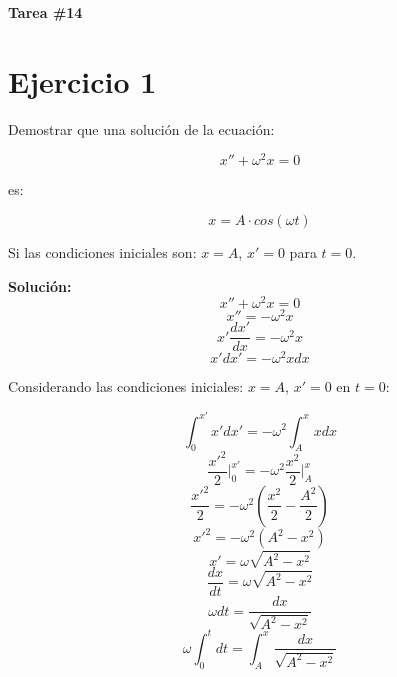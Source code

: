 \documentclass[letter,11pt]{article}
\begin{document}
\begin{center}
    {\Large \bf{Tarea \#14}}
\end{center}

\section{Ejercicio 1}

Demostrar que una solución de la ecuación:

\begin{equation}
    x'' + \omega^2 x = 0
\end{equation}

es:

\begin{equation}
    x = A \cdot cos(\omega t)
\end{equation}

Si las condiciones iniciales son: $x = A$, $x' = 0$ para $t = 0$.

\vspace{0.5cm}
\textbf{Solución:} \\

\begin{equation*}
    x'' + \omega^2 x = 0
\end{equation*}
\begin{equation*}
    x'' = - \omega^2 x
\end{equation*}
\begin{equation*}
    x' \frac{dx'}{dx} = - \omega^2 x
\end{equation*}
\begin{equation*}
    x' dx' = - \omega^2 x dx
\end{equation*}

Considerando las condiciones iniciales: $x = A$, $x' = 0$ en $t = 0$:

\begin{equation*}
    \int_{0}^{x'} x' dx' = - \omega^2 \int_{A}^{x} x dx
\end{equation*}
\begin{equation*}
    \frac{x'^2}{2} \Biggr|_{0}^{x'} = - \omega^2 \frac{x^2}{2} \Biggr|_{A}^{x}
\end{equation*}
\begin{equation*}
    \frac{x'^2}{2} = - \omega^2 \left( \frac{x^2}{2} - \frac{A^2}{2} \right)
\end{equation*}
\begin{equation*}
    x'^2 = - \omega^2 (A^2 - x^2)
\end{equation*}
\begin{equation*}
    x' = \omega \sqrt{A^2 - x^2}
\end{equation*}
\begin{equation*}
    \frac{dx}{dt} = \omega \sqrt{A^2 - x^2}
\end{equation*}
\begin{equation*}
    \omega dt = \frac{dx}{\sqrt{A^2 - x^2}}
\end{equation*}
\begin{equation*}
    \omega \int_{0}^{t} dt = \int_{A}^{x} \frac{dx}{\sqrt{A^2 - x^2}}
\end{equation*}
\end{document}
